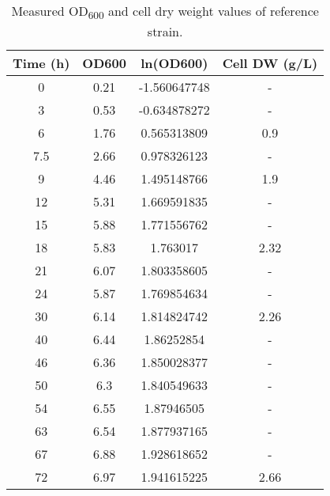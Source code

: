 \begin{table}[H]
\caption[Measured OD\textsubscript{600} and cell dry weight values of reference strain]{Measured OD\textsubscript{600} and cell dry weight values of reference strain.}
\begin{center}
  \begin{tabular}{|c|c|c|c|}
 \hline
  \textbf{Time (h)} & \textbf{OD600} & \textbf{ln(OD600)} & \textbf{Cell DW (g/L)} \\
  \hline
  0                 & 0.21           & -1.560647748       & -                      \\
  3                 & 0.53           & -0.634878272       & -                      \\
  6                 & 1.76           & 0.565313809        & 0.9                    \\
  7.5               & 2.66           & 0.978326123        & -                      \\
  9                 & 4.46           & 1.495148766        & 1.9                    \\
  12                & 5.31           & 1.669591835        & -                      \\
  15                & 5.88           & 1.771556762        & -                      \\
  18                & 5.83           & 1.763017           & 2.32                   \\
  21                & 6.07           & 1.803358605        & -                      \\
  24                & 5.87           & 1.769854634        & -                      \\
  30                & 6.14           & 1.814824742        & 2.26                   \\
  40                & 6.44           & 1.86252854         & -                      \\
  46                & 6.36           & 1.850028377        & -                      \\
  50                & 6.3            & 1.840549633        & -                      \\
  54                & 6.55           & 1.87946505         & -                      \\
  63                & 6.54           & 1.877937165        & -                      \\
  67                & 6.88           & 1.928618652        & -                      \\
  72                & 6.97           & 1.941615225        & 2.66                  \\
   \hline
  \end{tabular}
\label{table:experimental_OD600s_and_growths}
\end{center}
\end{table}

